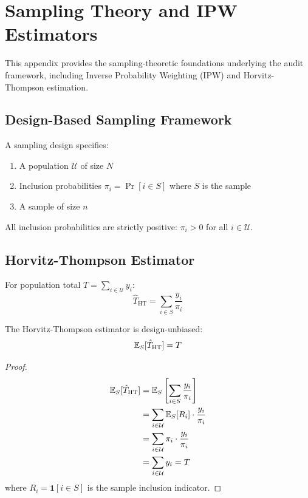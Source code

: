 \section{Sampling Theory and IPW Estimators}
\label{app:sampling}

This appendix provides the sampling-theoretic foundations underlying the audit framework, including Inverse Probability Weighting (IPW) and Horvitz-Thompson estimation.

\subsection{Design-Based Sampling Framework}

\begin{definition}
A sampling design specifies:
\begin{enumerate}
    \item A population $\mathcal{U}$ of size $N$
    \item Inclusion probabilities $\pi_i = \Pr[i \in S]$ where $S$ is the sample
    \item A sample of size $n$
\end{enumerate}
\end{definition}

\begin{assumption}
All inclusion probabilities are strictly positive: $\pi_i > 0$ for all $i \in \mathcal{U}$.
\end{assumption}

\subsection{Horvitz-Thompson Estimator}

\begin{definition}[HT Estimator]
For population total $T = \sum_{i \in \mathcal{U}} y_i$:
\[
\hat{T}_{\text{HT}} = \sum_{i \in S} \frac{y_i}{\pi_i}
\]
\end{definition}

\begin{theorem}[HT Unbiasedness]
The Horvitz-Thompson estimator is design-unbiased:
\[
\mathbb{E}_S[\hat{T}_{\text{HT}}] = T
\]
\end{theorem}

\begin{proof}
\begin{align*}
\mathbb{E}_S[\hat{T}_{\text{HT}}] &= \mathbb{E}_S\left[\sum_{i \in S} \frac{y_i}{\pi_i}\right] \\
&= \sum_{i \in \mathcal{U}} \mathbb{E}_S[R_i] \cdot \frac{y_i}{\pi_i} \\
&= \sum_{i \in \mathcal{U}} \pi_i \cdot \frac{y_i}{\pi_i} \\
&= \sum_{i \in \mathcal{U}} y_i = T
\end{align*}
where $R_i = \mathbf{1}[i \in S]$ is the sample inclusion indicator.
\end{proof}

